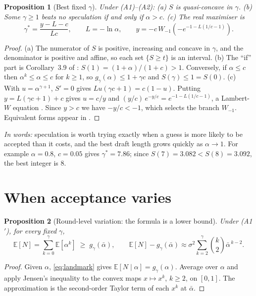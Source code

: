 \documentclass[10pt]{article}
\newtheorem{proposition}{Proposition}
\theoremstyle{remark}
\newcommand{\E}{\mathbb{E}}
\newcommand{\abar}{\bar{\alpha}}
\newcommand{\Wm}{W_{-1}}
\begin{document}
\begin{proposition}[Best fixed $\gamma$]\label{prop:fixed}
Under (A1)--(A2): (a) $S$ is quasi-concave in $\gamma$. (b) Some $\gamma\ge1$ beats no speculation if and only if
$\alpha>c$. (c) The real maximiser is
\begin{equation}\label{eq:lambert}
\gamma^*=\frac{y-L-c}{Lc},\qquad L=-\ln\alpha,\qquad y=-c\,\Wm\!\left(-e^{-1-L(1/c-1)}\right).
\end{equation}
\end{proposition}
\begin{proof}
(a) The numerator of $S$ is positive, increasing and concave in $\gamma$, and the denominator is positive and
affine, so each set $\{S\ge t\}$ is an interval. (b) The ``if'' part is Corollary~3.9 of \cite{leviathan}:
$S(1)=(1+\alpha)/(1+c)>1$. Conversely, if $\alpha\le c$ then $\alpha^k\le\alpha\le c$ for $k\ge1$, so
$g_\gamma(\alpha)\le1+\gamma c$ and $S(\gamma)\le1=S(0)$. (c) With $u=\alpha^{\gamma+1}$, $S'=0$ gives
$Lu(\gamma c+1)=c(1-u)$. Putting $y=L(\gamma c+1)+c$ gives $u=c/y$ and
$(y/c)\,e^{-y/c}=e^{-1-L(1/c-1)}$, a Lambert-$W$ equation \cite{corless}. Since $y>c$ we have $-y/c<-1$, which
selects the branch $\Wm$. Equivalent forms appear in \cite{zheng,sdsl}.
\end{proof}
\noindent\emph{In words:} speculation is worth trying exactly when a guess is more likely to be accepted than it
costs, and the best draft length grows quickly as $\alpha\to1$. For example $\alpha=0.8$, $c=0.05$ gives
$\gamma^*=7.86$; since $S(7)=3.082<S(8)=3.092$, the best integer is 8.

\section{When acceptance varies}\label{sec:varies}

\begin{proposition}[Round-level variation: the formula is a lower bound]\label{prop:round}
Under (A1$'$), for every fixed $\gamma$,
\begin{equation}\label{eq:jensen}
\E[N]=\sum_{k=0}^{\gamma}\E[\alpha^k]\;\ge\; g_\gamma(\abar),\qquad
\E[N]-g_\gamma(\abar)\approx\sigma^2\sum_{k=2}^{\gamma}\binom{k}{2}\abar^{\,k-2}.
\end{equation}
\end{proposition}
\begin{proof}
Given $\alpha$, \eqref{eq:landmark} gives $\E[N\mid\alpha]=g_\gamma(\alpha)$. Average over $\alpha$ and apply
Jensen's inequality \cite{jensen} to the convex maps $x\mapsto x^k$, $k\ge2$, on $[0,1]$. The approximation is the
second-order Taylor term of each $x^k$ at $\abar$.
\end{proof}
\end{document}
